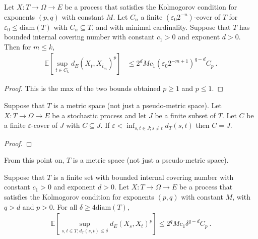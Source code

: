 \begin{lemma}\label{lem:second_term_bound}
  \leanok
Let $X : T \to \Omega \to E$ be a process that satisfies the Kolmogorov condition for exponents $(p,q)$ with constant $M$.
Let $C_n$ a finite $(\varepsilon_0 2^{-n})$-cover of $T$ for $\varepsilon_0 \le \mathrm{diam}(T)$ with $C_n \subseteq T$, and with minimal cardinality.
Suppose that $T$ has bounded internal covering number with constant $c_1>0$ and exponent $d > 0$.
Then for $m \le k$,
\begin{align*}
  \mathbb{E} \left[\sup_{t \in C_k} d_E(X_t, X_{\bar{t}_m})^p \right]
  &\le 2^d M c_1 (\varepsilon_0 2^{-m + 1})^{q - d} C_p
  \: .
\end{align*}
\end{lemma}

\begin{proof}
This is the max of the two bounds obtained $p \ge 1$ and $p \le 1$.
\end{proof}


\begin{lemma}\label{lem:cover_eq_of_lt_iInf_dist}
  \leanok
Suppose that $T$ is a metric space (not just a pseudo-metric space).
Let $X : T \to \Omega \to E$ be a stochastic process and let $J$ be a finite subset of $T$.
Let $C$ be a finite $\varepsilon$-cover of $J$ with $C \subseteq J$.
If $\varepsilon < \inf_{s, t \in J; s \ne t}d_T(s, t)$ then $C = J$.
\end{lemma}

\begin{proof}

\end{proof}

From this point on, $T$ is a metric space (not just a pseudo-metric space).

\begin{theorem}\label{thm:finite_set_bound_of_dist_le_of_diam_le}
  \leanok
Suppose that $T$ is a finite set with bounded internal covering number with constant $c_1>0$ and exponent $d > 0$.
Let $X : T \to \Omega \to E$ be a process that satisfies the Kolmogorov condition for exponents $(p,q)$ with constant $M$, with $q > d$ and $p > 0$.
For all $\delta \ge 4\mathrm{diam}(T)$,
\begin{align*}
  \mathbb{E}\left[ \sup_{s, t \in T; d_T(s, t) \le \delta} d_E(X_s, X_t)^p \right]
  \le 2^q M c_1 \delta^{q - d} C_p
  \: .
\end{align*}
\end{theorem}

